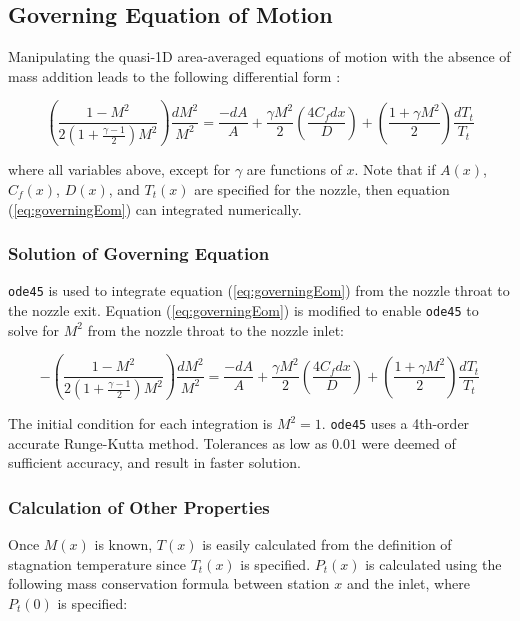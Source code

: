 \documentclass{article}
\begin{document}
\subsection{Governing Equation of Motion}

Manipulating the quasi-1D area-averaged equations of motion with the absence of mass addition leads to the following differential form \cite{cantwell210}:

\begin{equation}
\label{eq:governingEom}
\left(\frac{1-M^2}{2(1 + \frac{\gamma-1}{2} )M^2}\right) \frac{dM^2}{M^2} = \frac{-dA}{A} + \frac{\gamma M^2}{2} \left(\frac{4 C_f dx}{D}\right) + \left(\frac{1 + \gamma M^2}{2}\right) \frac{dT_t}{T_t}
\end{equation}

where all variables above, except for $\gamma$ are functions of $x$. Note that if $A(x)$, $C_f(x)$, $D(x)$, and $T_t(x)$ are specified for the nozzle, then equation (\ref{eq:governingEom}) can integrated numerically.

\subsubsection{Solution of Governing Equation}

\texttt{ode45} is used to integrate equation (\ref{eq:governingEom}) from the nozzle throat to the nozzle exit. Equation (\ref{eq:governingEom}) is modified to enable \texttt{ode45} to solve for $M^2$ from the nozzle throat to the nozzle inlet:

\begin{equation}
\label{eq:governingEomModified}
-\left(\frac{1-M^2}{2(1 + \frac{\gamma-1}{2} )M^2}\right) \frac{dM^2}{M^2} = \frac{-dA}{A} + \frac{\gamma M^2}{2} \left(\frac{4 C_f dx}{D}\right) + \left(\frac{1 + \gamma M^2}{2}\right) \frac{dT_t}{T_t}
\end{equation}

The initial condition for each integration is $M^2 = 1$. \texttt{ode45} uses a 4th-order accurate Runge-Kutta method. Tolerances as low as $0.01$ were deemed of sufficient accuracy, and result in faster solution.

\subsubsection{Calculation of Other Properties}
Once $M(x)$ is known, $T(x)$ is easily calculated from the definition of stagnation temperature since $T_t(x)$ is specified. $P_t(x)$ is calculated using the following mass conservation formula between station $x$ and the inlet, where $P_t(0)$ is specified:
\end{document}
